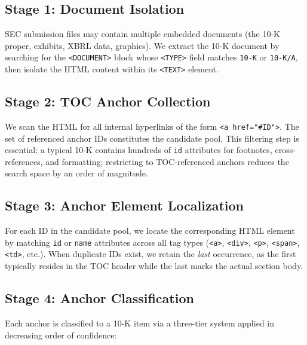 \documentclass[12pt,letterpaper,oneside]{article}
\begin{document}
\subsection{Stage 1: Document Isolation}

SEC submission files may contain multiple embedded documents (the 10-K
proper, exhibits, XBRL data, graphics). We extract the 10-K document
by searching for the \texttt{<DOCUMENT>} block whose \texttt{<TYPE>}
field matches \texttt{10-K} or \texttt{10-K/A}, then isolate the HTML
content within its \texttt{<TEXT>} element.

\subsection{Stage 2: TOC Anchor Collection}

We scan the HTML for all internal hyperlinks of the form
\texttt{<a href="\#ID">}. The set of referenced anchor IDs constitutes
the candidate pool. This filtering step is essential: a typical 10-K
contains hundreds of \texttt{id} attributes for footnotes,
cross-references, and formatting; restricting to TOC-referenced anchors
reduces the search space by an order of magnitude.

\subsection{Stage 3: Anchor Element Localization}

For each ID in the candidate pool, we locate the corresponding HTML
element by matching \texttt{id} or \texttt{name} attributes across
all tag types (\texttt{<a>}, \texttt{<div>}, \texttt{<p>},
\texttt{<span>}, \texttt{<td>}, etc.). When duplicate IDs exist, we
retain the \emph{last} occurrence, as the first typically resides in
the TOC header while the last marks the actual section body.

\subsection{Stage 4: Anchor Classification}\label{sec:classify}

Each anchor is classified to a 10-K item via a three-tier system
applied in decreasing order of confidence:
\end{document}
